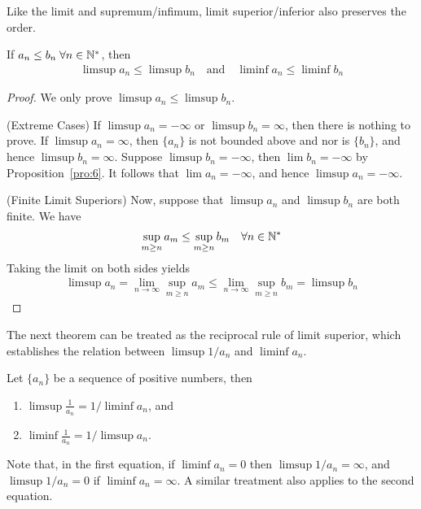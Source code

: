 \documentclass[thmcnt=section, 12pt]{my-elegantbook}
\begin{document}

Like the limit and supremum/infimum, limit superior/inferior also preserves the order.

\begin{theorem} \label{thm:59}
    If $a_n \leq b_n \; \forall n \in \mathbb{N}^\ast$, then 
    \begin{align*}
        \limsup a_n \leq \limsup b_n 
        \quad \text{and} \quad 
        \liminf a_n \leq \liminf b_n 
    \end{align*}
\end{theorem}

\begin{proof}
    We only prove $\limsup a_n \leq \limsup b_n$. 

    (Extreme Cases) If $\limsup a_n = -\infty$ or $\limsup b_n = \infty$, then there is nothing to prove. If $\limsup a_n = \infty$, then $\{a_n\}$ is not bounded above and nor is $\{b_n\}$, and hence $\limsup b_n = \infty$. Suppose $\limsup b_n = -\infty$, then $\lim b_n = -\infty$ by Proposition~\ref{pro:6}. It follows that $\lim a_n = -\infty$, and hence $\limsup a_n = -\infty$.

    (Finite Limit Superiors) Now, suppose that $\limsup a_n$ and $\limsup b_n$ are both finite. We have 
    \begin{align*}
        \sup_{m \geq n} a_m \leq \sup_{m \geq n} b_m
        \quad \forall n \in \mathbb{N}^\ast
    \end{align*}
    Taking the limit on both sides yields
    \begin{align*}
        \limsup a_n
        = \lim_{n \to \infty} \sup_{m \geq n} a_m 
        \leq \lim_{n \to \infty} \sup_{m \geq n} b_m
        = \limsup b_n
    \end{align*}
\end{proof}


The next theorem can be treated as the reciprocal rule of limit superior, which establishes the relation between $\limsup 1 / a_n$ and $\liminf a_n$.

\begin{theorem} \label{thm:60}
    Let $\{a_n\}$ be a sequence of positive numbers, then 
    \begin{enumerate}
        \item $\limsup \frac{1}{a_n} = 1 / \liminf a_n$, and 
        \item $\liminf \frac{1}{a_n} = 1 / \limsup a_n$.
    \end{enumerate}
    Note that, in the first equation, if $\liminf a_n = 0$ then $\limsup 1 / a_n = \infty$, and $\limsup 1 / a_n = 0$ if $\liminf a_n = \infty$. A similar treatment also applies to the second equation.
\end{theorem}
\end{document}
